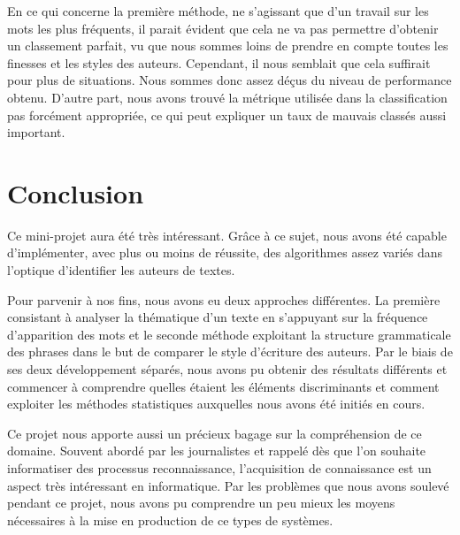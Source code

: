 \documentclass[a4paper,12pt]{report}
\begin{document}

En ce qui concerne la première méthode, ne s'agissant que d'un travail sur les mots les plus fréquents, il parait évident que cela ne va pas permettre d'obtenir un classement parfait, vu que nous sommes loins de prendre en compte toutes les finesses et les styles des auteurs. Cependant, il nous semblait que cela suffirait pour plus de situations. Nous sommes donc assez déçus du niveau de performance obtenu. D'autre part, nous avons trouvé la métrique utilisée dans la classification pas forcément appropriée, ce qui peut expliquer un taux de mauvais classés aussi important.


\section*{Conclusion}

Ce mini-projet aura été très intéressant. Grâce à ce sujet, nous avons été capable d'implémenter, avec plus ou moins de réussite, des algorithmes assez variés dans l'optique d'identifier les auteurs de textes.

Pour parvenir à nos fins, nous avons eu deux approches différentes. La première consistant à analyser la thématique d'un texte en s'appuyant sur la fréquence d'apparition des mots et le seconde méthode exploitant la structure grammaticale des phrases dans le but de comparer le style d'écriture des auteurs. Par le biais de ses deux développement séparés, nous avons pu obtenir des résultats différents et commencer à comprendre quelles étaient les éléments discriminants et comment exploiter les méthodes statistiques auxquelles nous avons été initiés en cours.

Ce projet nous apporte aussi un précieux bagage sur la compréhension de ce domaine. Souvent abordé par les journalistes et rappelé dès que l'on souhaite informatiser des processus reconnaissance, l'acquisition de connaissance est un aspect très intéressant en informatique. Par les problèmes que nous avons soulevé pendant ce projet, nous avons pu comprendre un peu mieux les moyens nécessaires à la mise en production de ce types de systèmes.
\end{document}
